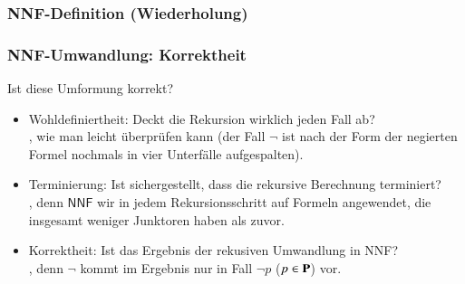 \documentclass[aspectratio=1610,onlymath]{beamer}
\begin{document}
\begin{frame}\frametitle{NNF-Definition (Wiederholung)}


\end{frame}

\begin{frame}\frametitle{NNF-Umwandlung: Korrektheit}

Ist diese Umformung korrekt?
\begin{itemize}
\item \alert{Wohldefiniertheit:} Deckt die Rekursion wirklich jeden Fall ab?\\\pause
	, wie man leicht überprüfen kann (der Fall $\neg$ ist nach der Form der negierten Formel nochmals in vier Unterfälle aufgespalten).\pause
\item \alert{Terminierung:} Ist sichergestellt, dass die rekursive Berechnung terminiert?\\\pause
	, denn $\textsf{NNF}$ wir in jedem Rekursionsschritt auf Formeln angewendet, die insgesamt weniger Junktoren haben als zuvor.\pause
\item \alert{Korrektheit:} Ist das Ergebnis der rekusiven Umwandlung in NNF?\\\pause
	, denn $\neg$ kommt im Ergebnis nur in Fall $\neg p$ ($p\in\textbf{\textcolor{black}{P}}$) vor.
\end{itemize}\pause


\end{frame}
\end{document}
